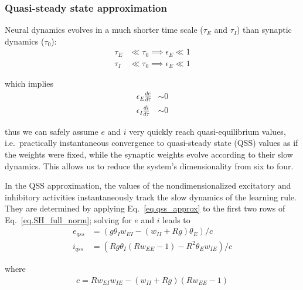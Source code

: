 \documentclass[twocolumn]{article}
\newcommand{\EE}{\mathit{EE}}
\newcommand{\EI}{\mathit{EI}}
\newcommand{\IE}{\mathit{IE}}
\newcommand{\II}{\mathit{II}}
\newcommand{\qss}{\mathit{qss}}
\begin{document}
\subsubsection{Quasi-steady state approximation}

Neural dynamics evolves in a much shorter time scale ($\tau_E$ and $\tau_I$) than synaptic dynamics ($\tau_0$):
\begin{displaymath}
\begin{aligned}
\tau_E & \ll \tau_0 \implies \epsilon_E \ll 1 \\
\tau_I & \ll \tau_0 \implies \epsilon_E \ll 1
\end{aligned}
\end{displaymath}

\noindent which implies
\begin{equation}
\begin{aligned}
\epsilon_E\frac{de}{d\tau} & \sim 0 \\
\epsilon_I\frac{di}{d\tau} & \sim 0
\end{aligned}
\label{eq.qss_approx}
\end{equation}

\noindent thus we can safely assume $e$ and $i$ very quickly reach quasi-equilibrium values, i.e.\ practically instantaneous convergence to quasi-steady state (QSS) values as if the weights were fixed, while the synaptic weights evolve according to their slow dynamics. This allows us to reduce the system's dimensionality from six to four.

In the QSS approximation, the values of the nondimensionalized excitatory and inhibitory activities instantaneously track the slow dynamics of the learning rule. They are determined by applying Eq.\ \ref{eq.qss_approx} to the first two rows of Eq.\ \ref{eq.SH_full_norm}; solving for $e$ and $i$ leads to
\begin{equation}
\begin{aligned}
e_{\qss} & = (g \theta_I w_{\EI} - (w_{\II} + Rg) \theta_E)/c \\
i_{\qss} & = (R g \theta_I (R w_{\EE} - 1) - R^2 \theta_E w_{\IE})/c
\end{aligned}
\label{eq.SH_upstate_qss}
\end{equation}

\noindent where
\begin{displaymath}
\begin{aligned}
c = R w_{\EI} w_{\IE} - (w_{\II} + Rg)(R w_{\EE} - 1)
\end{aligned}
\end{displaymath}
\end{document}
